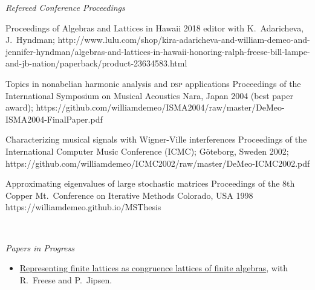 \noindent    \textit{Refereed Conference Proceedings}

\begin{enumerate}
  \setcounter{enumi}{5}
  \pubit
  {Proceedings of Algebras and Lattices in Hawaii 2018}
  {editor with K.~Adaricheva, J.~Hyndman;}
  {}
  {}{http://www.lulu.com/shop/kira-adaricheva-and-william-demeo-and-jennifer-hyndman/algebras-and-lattices-in-hawaii-honoring-ralph-freese-bill-lampe-and-jb-nation/paperback/product-23634583.html}

  \pubit
  {Topics in nonabelian harmonic analysis and \textsc{dsp}  applications}
  {}
  {Proceedings of the International Symposium on Musical Acoustics}
  {Nara, Japan 2004 (best paper award);}
  {https://github.com/williamdemeo/ISMA2004/raw/master/DeMeo-ISMA2004-FinalPaper.pdf}

  \pubit
  {Characterizing musical signals with Wigner-Ville interferences}
  {}
  {Proceedings of the International Computer Music Conference {\small (ICMC)};}
  {G\"{o}teborg, Sweden 2002;}
  {https://github.com/williamdemeo/ICMC2002/raw/master/DeMeo-ICMC2002.pdf}

  \pubit
  {Approximating eigenvalues of large stochastic matrices}
  {}
  {Proceedings of the 8th Copper Mt.~Conference on Iterative Methods}
  {Colorado, USA 1998}
  {https://williamdemeo.github.io/MSThesis}

\end{enumerate}

~\vspace{-14mm}

{\it Papers in Progress}\\[-8pt]
\begin{itemize}
  \item[] \href{https://github.com/UniversalAlgebra/fin-lat-rep}{Representing finite lattices as congruence lattices of finite algebras}, with R.~Freese and P.~Jipsen.
\end{itemize}

